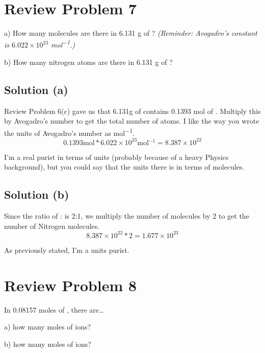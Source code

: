 \documentclass[10pt]{article}
\begin{document}
    \pagebreak
    \section{Review Problem 7}
        a) How many  molecules are there in 6.131 g of ? \textit{(Reminder: Avogadro's constant is $6.022 \times 10^{23}$ \unit{\mol^{-1}}.)} 
        
        \noindent
        b) How many nitrogen atoms are there in 6.131 g of ?

        \subsection{Solution (a)}
            Review Problem 6(c) gave us that 6.131g of  contains 0.1393 \unit{\mol} of .
            Multiply this by Avogadro's number to get the total number of atoms.
            I like the way you wrote the units of Avogadro's number as \unit{\mol^{-1}}. 
            \begin{equation}
                0.1393 \unit{\mol} * 6.022 \times 10^{23} \unit{\mol^{-1}} = \boxed{8.387 \times 10^{22}}
            \end{equation}

            I'm a real purist in terms of units (probably because of a heavy Physics background), but you could say that the units there is in terms of molecules.
        
        \subsection{Solution (b)}
            Since the ratio of : is 2:1, we multiply the number of molecules by 2 to get the number of Nitrogen molecules.
            \begin{equation}
                8.387 \times 10^{22} * 2 = \boxed{1.677 \times 10^{23}}
            \end{equation}

            As previously stated, I'm a units purist.
    
    \pagebreak
    \section{Review Problem 8}
        In 0.08157 moles of , there are…
        
        a) how many moles of  ions?
        
        b) how many moles of  ions?
        
\end{document}
